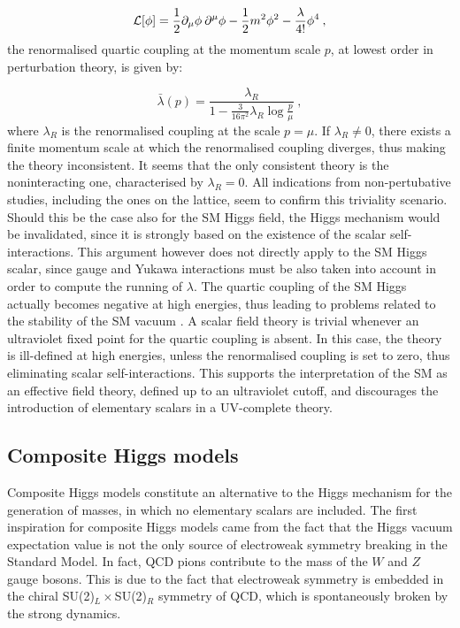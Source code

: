  \begin{equation}
 \mathcal L [\phi] = \frac{1}{2} \partial_{\mu} \phi \: \partial^{\mu} \phi - \frac{1}{2} m^2 \phi^2 - \frac{\lambda}{4!} \phi^4 \: ,
 \end{equation}
 the renormalised quartic coupling at the momentum scale $p$, at lowest order in perturbation theory, is given by:
 
 \begin{equation}
 \bar \lambda (p) = \frac{\lambda_R}{1- \frac{3}{16 \pi^2}  \lambda_R \log\frac{p}{\mu}} \: ,
 \label{trivial_running}
 \end{equation}
 where $\lambda_R$ is the renormalised coupling at the scale $p = \mu$. If $\lambda_R \neq 0$, there exists a finite momentum scale at which the renormalised coupling diverges, thus making the theory inconsistent. It seems that the only consistent theory is the noninteracting one, characterised by $\lambda_R = 0$. All indications from non-pertubative studies, including the ones on the lattice, seem to confirm this triviality scenario. 
 Should this be the case also for the SM Higgs field, the Higgs mechanism would be invalidated, since it is strongly based on the existence of the scalar self-interactions. 
 This argument however does not directly apply to the SM Higgs scalar, since gauge and Yukawa interactions must be also taken into account in order to compute the running of $\lambda$. The quartic coupling of the SM Higgs actually becomes negative at high energies, thus leading to problems related to the stability of the SM vacuum \cite{Degrassi:2012ry,Antipin:2013sga}. A scalar field theory is trivial whenever an ultraviolet fixed point for the quartic coupling is absent. In this case, the theory is ill-defined at high energies, unless the renormalised coupling is set to zero, thus eliminating scalar self-interactions. This supports the interpretation of the SM as an effective field theory, defined up to an ultraviolet cutoff, and discourages the introduction of elementary scalars in a UV-complete theory.
 


\subsection{Composite Higgs models}

Composite Higgs models constitute an alternative to the Higgs mechanism for the generation of masses, in which no elementary scalars are included. The first inspiration for composite Higgs models came from the fact that the Higgs vacuum expectation value is not the only source of electroweak symmetry breaking in the Standard Model. In fact, QCD pions contribute to the mass of the $W$ and $Z$ gauge bosons. This is due to the fact that electroweak symmetry is embedded in the chiral SU(2)$_L\times$SU(2)$_R$ symmetry of QCD, which is spontaneously broken by the strong dynamics.

